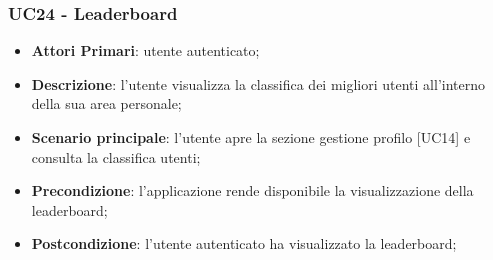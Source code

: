 
\subsubsection{UC24 - Leaderboard}
\begin{itemize}
	\item \textbf{Attori Primari}: utente autenticato;
	\item \textbf{Descrizione}: l'utente visualizza la classifica dei migliori utenti all'interno della sua area personale;
	\item \textbf{Scenario principale}: l'utente apre la sezione gestione profilo [UC14] e consulta la classifica utenti;
	\item \textbf{Precondizione}: l'applicazione rende disponibile la visualizzazione della leaderboard;
	\item \textbf{Postcondizione}: l'utente autenticato ha visualizzato la leaderboard;
\end{itemize}

